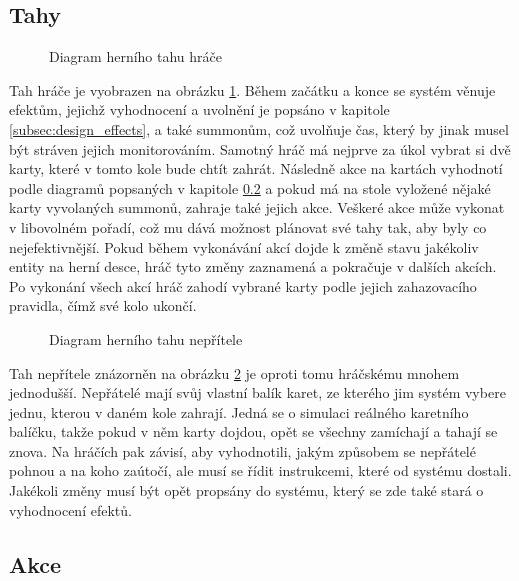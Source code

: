 \subsection{Tahy}
\label{subsec:design_turns}

\begin{figure}[h]
    \centering
    \caption{Diagram herního tahu hráče}
    \label{diag:player_turn}
\end{figure}

Tah hráče je vyobrazen na obrázku \ref{diag:player_turn}. Během začátku a konce se systém věnuje efektům, jejichž vyhodnocení a uvolnění je popsáno v kapitole \ref{subsec:design_effects}, a také summonům, což uvolňuje čas, který by jinak musel být stráven jejich monitorováním. Samotný hráč má nejprve za úkol vybrat si dvě karty, které v tomto kole bude chtít zahrát. Následně akce na kartách vyhodnotí podle diagramů popsaných v kapitole \ref{subsec:design_actions} a pokud má na stole vyložené nějaké karty vyvolaných summonů, zahraje také jejich akce. Veškeré akce může vykonat v libovolném pořadí, což mu dává možnost plánovat své tahy tak, aby byly co nejefektivnější. Pokud během vykonávání akcí dojde k změně stavu jakékoliv entity na herní desce, hráč tyto změny zaznamená a pokračuje v dalších akcích. Po vykonání všech akcí hráč zahodí vybrané karty podle jejich zahazovacího pravidla, čímž své kolo ukončí.

\begin{figure}[h]
    \centering
    \caption{Diagram herního tahu nepřítele}
    \label{diag:enemy_turn}
\end{figure}

Tah nepřítele znázorněn na obrázku \ref{diag:enemy_turn} je oproti tomu hráčskému mnohem jednodušší. Nepřátelé mají svůj vlastní balík karet, ze kterého jim systém vybere jednu, kterou v daném kole zahrají. Jedná se o simulaci reálného karetního balíčku, takže pokud v něm karty dojdou, opět se všechny zamíchají a tahají se znova. Na hráčích pak závisí, aby vyhodnotili, jakým způsobem se nepřátelé pohnou a na koho zaútočí, ale musí se řídit instrukcemi, které od systému dostali. Jakékoli změny musí být opět propsány do systému, který se zde také stará o vyhodnocení efektů.


\subsection{Akce}
\label{subsec:design_actions}

